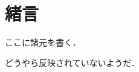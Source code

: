 \documentclass[main]{subfiles}
\begin{document}
\chapter{緒言}
ここに諸元を書く\cite{ref:mnih2013playing}．

どうやら反映されていないようだ．
\end{document}

